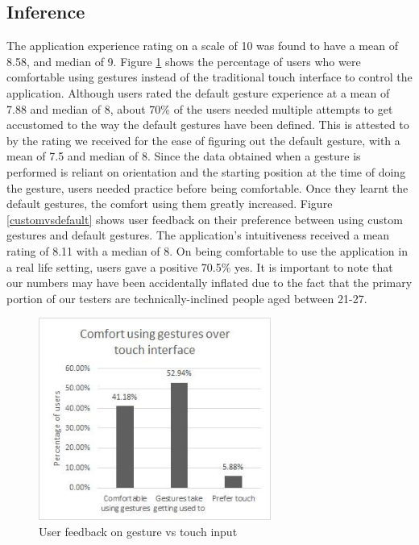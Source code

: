 \documentclass[journal]{IEEEtran}
\begin{document}
\subsection{Inference}

The application experience rating on a scale of 10 was found to have a mean of 8.58,  and median of 9. Figure \ref{gesturevstouch} shows the percentage of users who were comfortable using gestures instead of the traditional touch interface to control the application.  Although users rated the default gesture experience at a mean of 7.88 and median of 8, about 70\% of the users needed multiple attempts to get accustomed to the way the default gestures have been defined. This is attested to by the rating we received for the ease of figuring out the default gesture, with a mean of 7.5 and median of 8. Since the data obtained when a gesture is performed is reliant on orientation and the starting position at the time of doing the gesture, users needed practice before being comfortable. Once they learnt the default gestures, the comfort using them greatly increased. Figure \ref{customvsdefault} shows user feedback on their preference between using custom gestures and default gestures. The application's intuitiveness received a mean rating of 8.11 with a median of 8. On being comfortable to use the application in a real life setting, users gave a positive 70.5\% yes. It is important to note that our numbers may have been accidentally inflated due to the fact that the primary portion of our testers are technically-inclined people aged between 21-27.
	

\begin{figure}[!t]
\centering
\includegraphics[width=3in]{R5.jpg}
\caption{User feedback on gesture vs touch input}
\label{gesturevstouch}
\end{figure}
\end{document}
